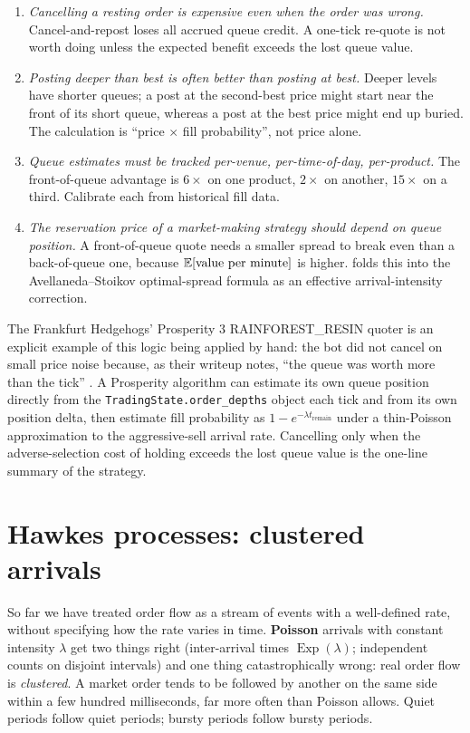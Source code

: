 \begin{enumerate}
  \item \emph{Cancelling a resting order is expensive even when
  the order was wrong.} Cancel-and-repost loses all accrued
  queue credit. A one-tick re-quote is not worth doing unless
  the expected benefit exceeds the lost queue value.
  \item \emph{Posting deeper than best is often better than
  posting at best.} Deeper levels have shorter queues; a post at
  the second-best price might start near the front of its short
  queue, whereas a post at the best price might end up buried.
  The calculation is ``price $\times$ fill probability'', not
  price alone.
  \item \emph{Queue estimates must be tracked per-venue,
  per-time-of-day, per-product.} The front-of-queue advantage is
  $6\times$ on one product, $2\times$ on another, $15\times$ on a
  third. Calibrate each from historical fill data.
  \item \emph{The reservation price of a market-making strategy
  should depend on queue position.} A front-of-queue quote needs
  a smaller spread to break even than a back-of-queue one,
  because $\mathbb{E}[\text{value per minute}]$ is higher.
   folds this into the Avellaneda--Stoikov
  optimal-spread formula as an effective arrival-intensity
  correction.
\end{enumerate}

The Frankfurt Hedgehogs' Prosperity 3 RAINFOREST\_RESIN quoter
is an explicit example of this logic being applied by hand:
the bot did not cancel on small price noise because, as
their writeup notes, ``the queue was worth more than the
tick'' \citep{frankfurtHedgehogs2025imcP3}. A Prosperity
algorithm can estimate its own queue position directly from
the \texttt{TradingState.order\_depths} object each tick and
from its own position delta, then estimate fill probability as
$1 - e^{-\lambda t_{\text{remain}}}$ under a thin-Poisson
approximation to the aggressive-sell arrival rate. Cancelling
only when the adverse-selection cost of holding exceeds the
lost queue value is the one-line summary of the strategy.

\section{Hawkes processes: clustered arrivals}
\label{sec:hawkes}

So far we have treated order flow as a stream of events with a
well-defined rate, without specifying how the rate varies in
time. \textbf{Poisson} arrivals with constant intensity $\lambda$
get two things right (inter-arrival times
$\operatorname{Exp}(\lambda)$; independent counts on disjoint
intervals) and one thing catastrophically wrong: real order flow
is \emph{clustered}. A market order tends to be followed by
another on the same side within a few hundred milliseconds, far
more often than Poisson allows. Quiet periods follow quiet
periods; bursty periods follow bursty periods.

